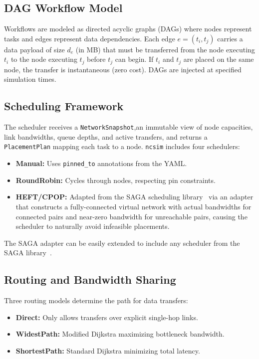 \documentclass[conference]{IEEEtran}
\newcommand{\ncsim}{\texttt{ncsim}}
\begin{document}
\subsection{DAG Workflow Model}

Workflows are modeled as directed acyclic graphs (DAGs) where nodes represent
tasks and edges represent data dependencies.  Each edge $e = (t_i, t_j)$
carries a data payload of size $d_e$ (in MB) that must be transferred from
the node executing $t_i$ to the node executing $t_j$ before $t_j$ can begin.
If $t_i$ and $t_j$ are placed on the same node, the transfer is
instantaneous (zero cost).  DAGs are injected at specified simulation times.

\subsection{Scheduling Framework}

The scheduler receives a \texttt{NetworkSnapshot},an immutable view of
node capacities, link bandwidths, queue depths, and active transfers, and
returns a \texttt{PlacementPlan} mapping each task to a node.  \ncsim{}
includes four schedulers:

\begin{itemize}[itemsep=1pt,leftmargin=*]
\item \textbf{Manual:} Uses \texttt{pinned\_to} annotations from the YAML.
\item \textbf{RoundRobin:} Cycles through nodes, respecting pin constraints.
\item \textbf{HEFT/CPOP:} Adapted from the SAGA scheduling library~\cite{heft}
  via an adapter that constructs a fully-connected virtual network with actual
  bandwidths for connected pairs and near-zero bandwidth for unreachable
  pairs, causing the scheduler to naturally avoid infeasible placements.
\end{itemize}
\noindent The SAGA adapter can be easily extended to include any scheduler
from the SAGA library~\cite{SAGARepo}.

\subsection{Routing and Bandwidth Sharing}

Three routing models determine the path for data transfers:

\begin{itemize}[itemsep=1pt,leftmargin=*]
\item \textbf{Direct:} Only allows transfers over explicit single-hop links.
\item \textbf{WidestPath:} Modified Dijkstra maximizing bottleneck bandwidth.
\item \textbf{ShortestPath:} Standard Dijkstra minimizing total latency.
\end{itemize}
\end{document}
